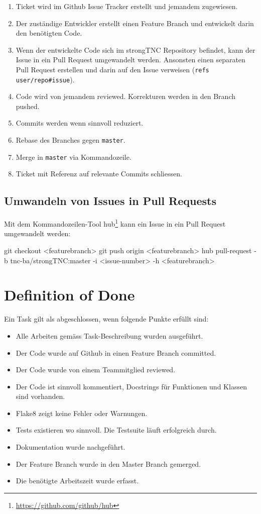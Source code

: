 \begin{enumerate}
	\item Ticket wird im Github Issue Tracker erstellt und jemandem zugewiesen.
	\item Der zuständige Entwickler erstellt einen Feature Branch und entwickelt
		darin den benötigten Code.
	\item Wenn der entwickelte Code sich im strongTNC Repository befindet, kann
		der Issue in ein Pull Request umgewandelt werden. Ansonsten einen separaten
		Pull Request erstellen und darin auf den Issue verweisen (\texttt{refs
		user/repo\#issue}).
	\item Code wird von jemandem reviewed. Korrekturen werden in den Branch
		pushed.
	\item Commits werden wenn sinnvoll reduziert.
	\item Rebase des Branches gegen \texttt{master}.
	\item Merge in \texttt{master} via Kommandozeile.
	\item Ticket mit Referenz auf relevante Commits schliessen.
\end{enumerate}

\subsection{Umwandeln von Issues in Pull Requests}

Mit dem Kommandozeilen-Tool hub\footnote{\url{https://github.com/github/hub}}
kann ein Issue in ein Pull Request umgewandelt werden:

\begin{bashcode}
git checkout <featurebranch>
git push origin <featurebranch>
hub pull-request -b tnc-ba/strongTNC:master -i <issue-number> -h <featurebranch>
\end{bashcode}


\section{Definition of Done}
\label{DefinitionOfDone}

Ein Task gilt als abgeschlossen, wenn folgende Punkte erfüllt sind:

\begin{itemize}
	\item Alle Arbeiten gemäss Task-Beschreibung wurden ausgeführt.
	\item Der Code wurde auf Github in einen Feature Branch committed.
	\item Der Code wurde von einem Teammitglied reviewed.
	\item Der Code ist sinnvoll kommentiert, Docstrings für Funktionen und Klassen sind vorhanden.
	\item Flake8 zeigt keine Fehler oder Warnungen.
	\item Tests existieren wo sinnvoll. Die Testsuite läuft erfolgreich durch.
	\item Dokumentation wurde nachgeführt.
	\item Der Feature Branch wurde in den Master Branch gemerged.
	\item Die benötigte Arbeitszeit wurde erfasst.
\end{itemize}



